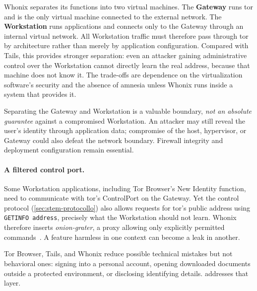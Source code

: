 Whonix separates its functions into two virtual machines. The \textbf{Gateway} runs tor and is the only virtual machine connected to the external network. The \textbf{Workstation} runs applications and connects only to the Gateway through an internal virtual network. All Workstation traffic must therefore pass through tor by architecture rather than merely by application configuration. Compared with Tails, this provides stronger separation: even an attacker gaining administrative control over the Workstation cannot directly learn the real address, because that machine does not know it. The trade-offs are dependence on the virtualization software's security and the absence of amnesia unless Whonix runs inside a system that provides it.

Separating the Gateway and Workstation is a valuable boundary, \emph{not an absolute guarantee} against a compromised Workstation. An attacker may still reveal the user's identity through application data; compromise of the host, hypervisor, or Gateway could also defeat the network boundary. Firewall integrity and deployment configuration remain essential.

\paragraph{A filtered control port.} Some Workstation applications, including Tor Browser's New Identity function, need to communicate with tor's ControlPort on the Gateway. Yet the control protocol (\cref{sec:stem-protocollo}) also allows requests for tor's public address using \texttt{GETINFO address}, precisely what the Workstation should not learn. Whonix therefore inserts \emph{onion-grater}, a proxy allowing only explicitly permitted commands~\cite{whonixgrater}. A feature harmless in one context can become a leak in another.

\begin{attenzione}
Tor Browser, Tails, and Whonix reduce possible technical mistakes but not behavioral ones: signing into a personal account, opening downloaded documents outside a protected environment, or disclosing identifying details.  addresses that layer.
\end{attenzione}

